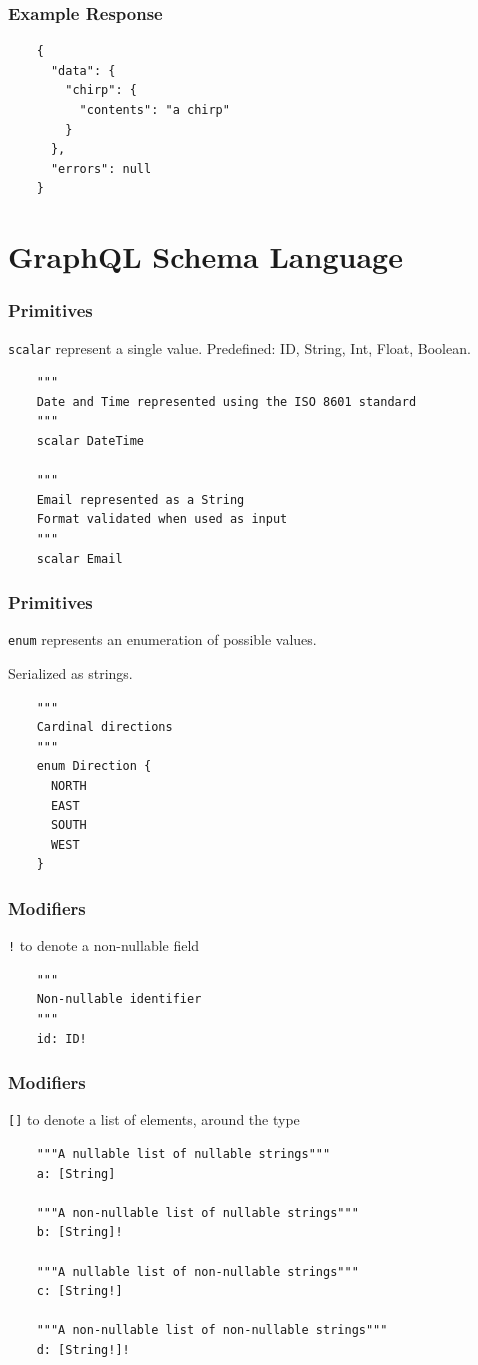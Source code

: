 \documentclass{beamer}
\begin{document}
\begin{frame}[fragile]
  \frametitle{Example Response}
  \begin{verbatim}
    {
      "data": {
        "chirp": {
          "contents": "a chirp"
        }
      },
      "errors": null
    }
  \end{verbatim}
\end{frame}


\section{GraphQL Schema Language}
\begin{frame}[fragile=singleslide]
  \frametitle{Primitives}
  \texttt{scalar} represent a single
  value. Predefined: ID, String, Int, Float, Boolean.
  \begin{verbatim}
    """
    Date and Time represented using the ISO 8601 standard
    """
    scalar DateTime

    """
    Email represented as a String
    Format validated when used as input
    """
    scalar Email
  \end{verbatim}
\end{frame}

\begin{frame}[fragile]
  \frametitle{Primitives}
  \texttt{enum} represents an enumeration of possible values.

  Serialized as strings.

  \begin{verbatim}
    """
    Cardinal directions
    """
    enum Direction {
      NORTH
      EAST
      SOUTH
      WEST
    }
  \end{verbatim}
\end{frame}


\begin{frame}[fragile]
  \frametitle{Modifiers}
  \texttt{!} to denote a non-nullable field
  \begin{verbatim}
    """
    Non-nullable identifier
    """
    id: ID!
  \end{verbatim}
\end{frame}

\begin{frame}[fragile]
  \frametitle{Modifiers}
  \texttt{[]} to denote a list of elements, around the type
  \begin{verbatim}
    """A nullable list of nullable strings"""
    a: [String]
    
    """A non-nullable list of nullable strings"""
    b: [String]!
    
    """A nullable list of non-nullable strings"""
    c: [String!]
    
    """A non-nullable list of non-nullable strings"""
    d: [String!]!
  \end{verbatim}
\end{frame}
\end{document}
